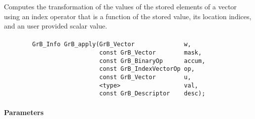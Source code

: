 Computes the transformation of the values of the stored elements of a vector
using an index operator that is a function of the stored value, its location 
indices, and an user provided scalar value.

\paragraph{\syntax}

\begin{verbatim}
        GrB_Info GrB_apply(GrB_Vector              w,
                           const GrB_Vector        mask,
                           const GrB_BinaryOp      accum,
                           const GrB_IndexVectorOp op,
                           const GrB_Vector        u,
                           <type>                  val,
                           const GrB_Descriptor    desc);
\end{verbatim}

\paragraph{Parameters}

